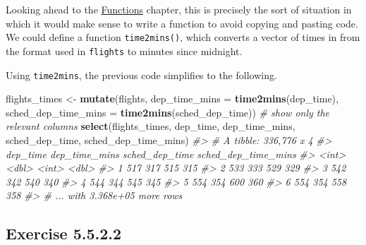 \documentclass[]{book}
\newenvironment{Shaded}{\begin{snugshade}}{\end{snugshade}}
\newcommand{\CommentTok}[1]{\textcolor[rgb]{0.56,0.35,0.01}{\textit{#1}}}
\newcommand{\ControlFlowTok}[1]{\textcolor[rgb]{0.13,0.29,0.53}{\textbf{#1}}}
\newcommand{\DataTypeTok}[1]{\textcolor[rgb]{0.13,0.29,0.53}{#1}}
\newcommand{\DecValTok}[1]{\textcolor[rgb]{0.00,0.00,0.81}{#1}}
\newcommand{\KeywordTok}[1]{\textcolor[rgb]{0.13,0.29,0.53}{\textbf{#1}}}
\newcommand{\NormalTok}[1]{#1}
\newcommand{\OperatorTok}[1]{\textcolor[rgb]{0.81,0.36,0.00}{\textbf{#1}}}
\newcommand{\StringTok}[1]{\textcolor[rgb]{0.31,0.60,0.02}{#1}}
\theoremstyle{plain}
\theoremstyle{remark}
\begin{document}
Looking ahead to the
\href{http://r4ds.had.co.nz/functions.html}{Functions} chapter, this is
precisely the sort of situation in which it would make sense to write a
function to avoid copying and pasting code. We could define a function
\texttt{time2mins()}, which converts a vector of times in from the
format used in \texttt{flights} to minutes since midnight.

\begin{Shaded}
\end{Shaded}

Using \texttt{time2mins}, the previous code simplifies to the following.

\begin{Shaded}
\begin{Highlighting}[]
\NormalTok{flights_times <-}\StringTok{ }\KeywordTok{mutate}\NormalTok{(flights,}
       \DataTypeTok{dep_time_mins =} \KeywordTok{time2mins}\NormalTok{(dep_time),}
       \DataTypeTok{sched_dep_time_mins =} \KeywordTok{time2mins}\NormalTok{(sched_dep_time))}
\CommentTok{# show only the relevant columns}
\KeywordTok{select}\NormalTok{(flights_times, dep_time, dep_time_mins, sched_dep_time, }
\NormalTok{       sched_dep_time_mins)}
\CommentTok{#> # A tibble: 336,776 x 4}
\CommentTok{#>   dep_time dep_time_mins sched_dep_time sched_dep_time_mins}
\CommentTok{#>      <int>         <dbl>          <int>               <dbl>}
\CommentTok{#> 1      517           317            515                 315}
\CommentTok{#> 2      533           333            529                 329}
\CommentTok{#> 3      542           342            540                 340}
\CommentTok{#> 4      544           344            545                 345}
\CommentTok{#> 5      554           354            600                 360}
\CommentTok{#> 6      554           354            558                 358}
\CommentTok{#> # ... with 3.368e+05 more rows}
\end{Highlighting}
\end{Shaded}

\hypertarget{exercise-5.5.2.2}{%
\subsection*{\texorpdfstring{Exercise
{5.5.2.2}}{Exercise 5.5.2.2}}\label{exercise-5.5.2.2}}
\end{document}

